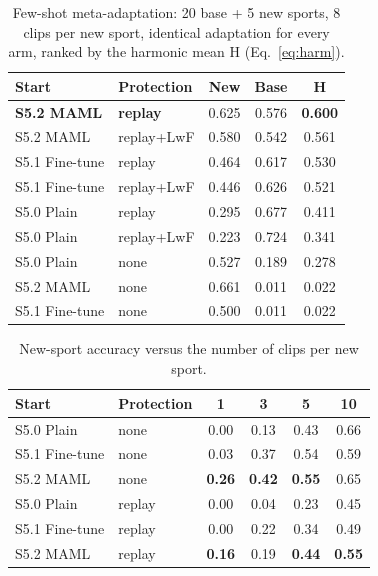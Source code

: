 \documentclass[conference]{IEEEtran}
\begin{document}
\begin{table}[t]
\centering
\caption{Few-shot meta-adaptation: 20 base + 5 new sports, 8 clips per new sport, identical
adaptation for every arm, ranked by the harmonic mean H (Eq.~\ref{eq:harm}).}
\label{tab:meta}
\renewcommand{\arraystretch}{1.1}
\begin{tabular}{llccc}
\toprule
Start & Protection & New & Base & \textbf{H} \\
\midrule
\textbf{S5.2 MAML} & \textbf{replay} & 0.625 & 0.576 & \textbf{0.600} \\
S5.2 MAML          & replay+LwF      & 0.580 & 0.542 & 0.561 \\
S5.1 Fine-tune     & replay          & 0.464 & 0.617 & 0.530 \\
S5.1 Fine-tune     & replay+LwF      & 0.446 & 0.626 & 0.521 \\
S5.0 Plain         & replay          & 0.295 & 0.677 & 0.411 \\
S5.0 Plain         & replay+LwF      & 0.223 & 0.724 & 0.341 \\
S5.0 Plain         & none            & 0.527 & 0.189 & 0.278 \\
S5.2 MAML          & none            & 0.661 & 0.011 & 0.022 \\
S5.1 Fine-tune     & none            & 0.500 & 0.011 & 0.022 \\
\bottomrule
\end{tabular}
\end{table}

\begin{table}[t]
\centering
\caption{New-sport accuracy versus the number of clips per new sport.}
\label{tab:shots}
\renewcommand{\arraystretch}{1.1}
\begin{tabular}{llcccc}
\toprule
Start & Protection & 1 & 3 & 5 & 10 \\
\midrule
S5.0 Plain     & none   & 0.00 & 0.13 & 0.43 & 0.66 \\
S5.1 Fine-tune & none   & 0.03 & 0.37 & 0.54 & 0.59 \\
S5.2 MAML      & none   & \textbf{0.26} & \textbf{0.42} & \textbf{0.55} & 0.65 \\
\midrule
S5.0 Plain     & replay & 0.00 & 0.04 & 0.23 & 0.45 \\
S5.1 Fine-tune & replay & 0.00 & 0.22 & 0.34 & 0.49 \\
S5.2 MAML      & replay & \textbf{0.16} & 0.19 & \textbf{0.44} & \textbf{0.55} \\
\bottomrule
\end{tabular}
\end{table}
\end{document}
